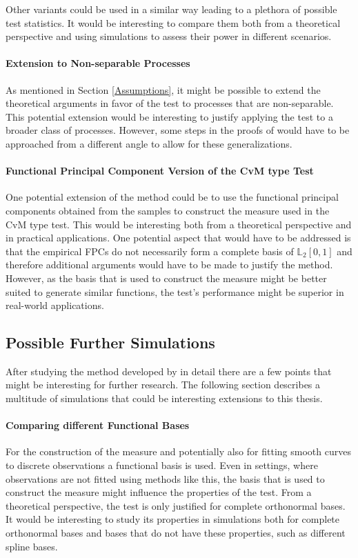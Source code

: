 \documentclass[12pt, a4paper]{article}
\theoremstyle{MAstyle} \newtheorem{assumption}{Assumption}[section]
\theoremstyle{MAstyle} \newtheorem{definition}{Definition}[section]
\theoremstyle{MAstyle} \newtheorem{theorem}{Theorem}[section]
\begin{document}
			Other variants could be used in a similar way leading to a plethora of possible test statistics. It would be interesting to compare them both from a theoretical perspective and using simulations to assess their power in different scenarios.
			
			\paragraph{Extension to Non-separable Processes\\}
			As mentioned in Section \ref{Assumptions}, it might be possible to extend the theoretical arguments in favor of the test to processes that are non-separable. This potential extension would be interesting to justify applying the test to a broader class of processes. However, some steps in the proofs of \cite{bugni_permutation_2021} would have to be approached from a different angle to allow for these generalizations.
			
			\paragraph{Functional Principal Component Version of the CvM type Test\\}
			One potential extension of the method could be to use the functional principal components obtained from the samples to construct the measure used in the CvM type test. This would be interesting both from a theoretical perspective and in practical applications. One potential aspect that would have to be addressed is that the empirical FPCs do not necessarily form a complete basis of $\mathbb{L}_2[0,1]$ and therefore additional arguments would have to be made to justify the method. However, as the basis that is used to construct the measure might be better suited to generate similar functions, the test's performance might be superior in real-world applications.
		
		\subsection{Possible Further Simulations}
			After studying the method developed by \cite{bugni_permutation_2021} in detail there are a few points that might be interesting for further research. The following section describes a multitude of simulations that could be interesting extensions to this thesis.
			
			\paragraph{Comparing different Functional Bases\\} 
			For the construction of the measure and potentially also for fitting smooth curves to discrete observations a functional basis is used. Even in settings, where observations are not fitted using methods like this, the basis that is used to construct the measure might influence the properties of the test. From a theoretical perspective, the test is only justified for complete orthonormal bases. It would be interesting to study its properties in simulations both for complete orthonormal bases and bases that do not have these properties, such as different spline bases.
		
\end{document}
